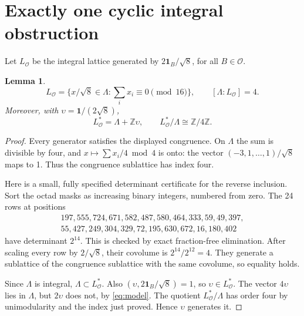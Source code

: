 \documentclass[10pt,reqno]{amsart}
\newtheorem{lemma}[theorem]{Lemma}
\theoremstyle{remark}\newtheorem{remark}[theorem]{Remark}
\newcommand{\Z}{\mathbb Z}\newcommand{\Q}{\mathbb Q}\newcommand{\R}{\mathbb R}\newcommand{\F}{\mathbb F}
\newcommand{\La}{\Lambda}\newcommand{\tr}{\operatorname{tr}}
\newcommand{\one}{\mathbf1}\newcommand{\Span}{\operatorname{span}}
\begin{document}
\section{Exactly one cyclic integral obstruction}
Let $L_{\mathcal O}$ be the integral lattice generated by $2\one_B/\sqrt8$, for all $B\in\mathcal O$.
\begin{lemma}\label{lem:indexfour}
\[
L_{\mathcal O}=\{x/\sqrt8\in\La:\sum_i x_i\equiv0\pmod{16}\},\qquad
[\La:L_{\mathcal O}]=4.
\]
Moreover, with $\upsilon=\one/(2\sqrt8)$,
\[
L_{\mathcal O}^*=\La+\Z\upsilon,\qquad
L_{\mathcal O}^*/\La\cong\Z/4\Z.
\]
\end{lemma}
\begin{proof}
Every generator satisfies the displayed congruence. On $\La$ the sum is divisible by four, and $x\mapsto\sum x_i/4\bmod4$ is onto: the vector $(-3,1,\ldots,1)/\sqrt8$ maps to 1. Thus the congruence sublattice has index four.

Here is a small, fully specified determinant certificate for the reverse inclusion. Sort the octad masks as increasing binary integers, numbered from zero. The 24 rows at positions
\[
\begin{gathered}
197,555,724,671,582,487,580,464,333,59,49,397,\\
55,427,249,304,329,72,195,630,672,16,180,402
\end{gathered}
\]
have determinant $2^{14}$. This is checked by exact fraction-free elimination. After scaling every row by $2/\sqrt8$, their covolume is $2^{14}/2^{12}=4$. They generate a sublattice of the congruence sublattice with the same covolume, so equality holds.

Since $\La$ is integral, $\La\subset L_{\mathcal O}^*$. Also $(\upsilon,2\one_B/\sqrt8)=1$, so $\upsilon\in L_{\mathcal O}^*$. The vector $4\upsilon$ lies in $\La$, but $2\upsilon$ does not, by \eqref{eq:model}. The quotient $L_{\mathcal O}^*/\La$ has order four by unimodularity and the index just proved. Hence $\upsilon$ generates it.
\end{proof}
\end{document}
